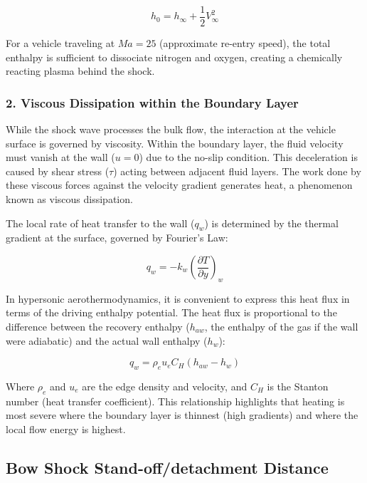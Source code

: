 \begin{equation}
    h_0 = h_{\infty} + \frac{1}{2} V_{\infty}^2
\end{equation}

For a vehicle traveling at $Ma = 25$ (approximate re-entry speed), the total enthalpy is sufficient to dissociate nitrogen and oxygen, creating a chemically reacting plasma behind the shock.

\subsubsection*{2. Viscous Dissipation within the Boundary Layer}
While the shock wave processes the bulk flow, the interaction at the vehicle surface is governed by viscosity. Within the boundary layer, the fluid velocity must vanish at the wall ($u=0$) due to the no-slip condition. This deceleration is caused by shear stress ($\tau$) acting between adjacent fluid layers. The work done by these viscous forces against the velocity gradient generates heat, a phenomenon known as viscous dissipation.
\par
The local rate of heat transfer to the wall ($q_w$) is determined by the thermal gradient at the surface, governed by Fourier’s Law:

\begin{equation}
    q_w = -k_w \left( \frac{\partial T}{\partial y} \right)_{w}
\end{equation}

In hypersonic aerothermodynamics, it is convenient to express this heat flux in terms of the driving enthalpy potential. The heat flux is proportional to the difference between the recovery enthalpy ($h_{aw}$, the enthalpy of the gas if the wall were adiabatic) and the actual wall enthalpy ($h_w$):

\begin{equation}
    q_w = \rho_e u_e C_H (h_{aw} - h_w)
\end{equation}

Where $\rho_e$ and $u_e$ are the edge density and velocity, and $C_H$ is the Stanton number (heat transfer coefficient). This relationship highlights that heating is most severe where the boundary layer is thinnest (high gradients) and where the local flow energy is highest.


\subsection{Bow Shock Stand-off/detachment Distance}

